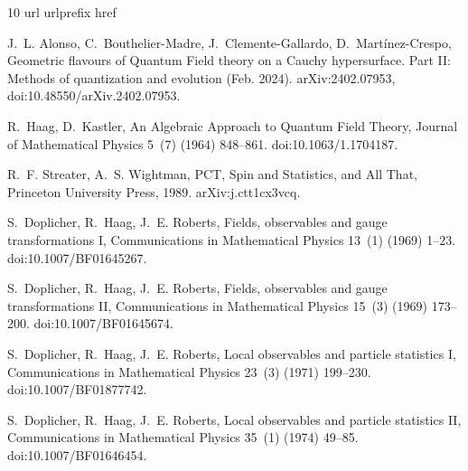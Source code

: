 \documentclass{elsarticle}%
\begin{document}
\begin{thebibliography}{10}
    \expandafter\ifx\csname url\endcsname\relax
      \def\url#1{\texttt{#1}}\fi
    \expandafter\ifx\csname urlprefix\endcsname\relax\def\urlprefix{URL }\fi
    \expandafter\ifx\csname href\endcsname\relax
      \def\href#1#2{#2} \def\path#1{#1}\fi
    
    J.~L. Alonso, C.~{Bouthelier-Madre}, J.~{Clemente-Gallardo}, D.~{Mart{\'i}nez-Crespo}, Geometric flavours of {{Quantum Field}} theory on a {{Cauchy}} hypersurface. {{Part II}}: {{Methods}} of quantization and evolution (Feb. 2024).
    \newblock \href {http://arxiv.org/abs/2402.07953} {\path{arXiv:2402.07953}}, \href {https://doi.org/10.48550/arXiv.2402.07953} {\path{doi:10.48550/arXiv.2402.07953}}.
    
    R.~Haag, D.~Kastler, An {{Algebraic Approach}} to {{Quantum Field Theory}}, Journal of Mathematical Physics 5~(7) (1964) 848--861.
    \newblock \href {https://doi.org/10.1063/1.1704187} {\path{doi:10.1063/1.1704187}}.
    
    R.~F. Streater, A.~S. Wightman, {{PCT}}, {{Spin}} and {{Statistics}}, and {{All That}}, Princeton University Press, 1989.
    \newblock \href {http://arxiv.org/abs/j.ctt1cx3vcq} {\path{arXiv:j.ctt1cx3vcq}}.
    
    S.~Doplicher, R.~Haag, J.~E. Roberts, Fields, observables and gauge transformations {{I}}, Communications in Mathematical Physics 13~(1) (1969) 1--23.
    \newblock \href {https://doi.org/10.1007/BF01645267} {\path{doi:10.1007/BF01645267}}.
    
    S.~Doplicher, R.~Haag, J.~E. Roberts, Fields, observables and gauge transformations {{II}}, Communications in Mathematical Physics 15~(3) (1969) 173--200.
    \newblock \href {https://doi.org/10.1007/BF01645674} {\path{doi:10.1007/BF01645674}}.
    
    S.~Doplicher, R.~Haag, J.~E. Roberts, Local observables and particle statistics {{I}}, Communications in Mathematical Physics 23~(3) (1971) 199--230.
    \newblock \href {https://doi.org/10.1007/BF01877742} {\path{doi:10.1007/BF01877742}}.
    
    S.~Doplicher, R.~Haag, J.~E. Roberts, Local observables and particle statistics {{II}}, Communications in Mathematical Physics 35~(1) (1974) 49--85.
    \newblock \href {https://doi.org/10.1007/BF01646454} {\path{doi:10.1007/BF01646454}}.
    

\end{thebibliography}
\end{document}
